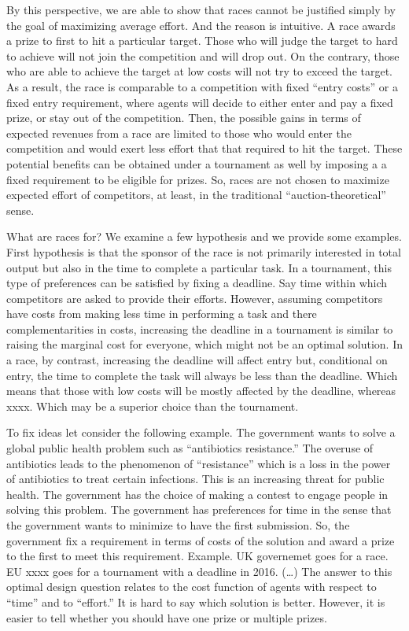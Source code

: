 \documentclass[12pt,]{article}
\begin{document}
By this perspective, we are able to show that races cannot be justified
simply by the goal of maximizing average effort. And the reason is
intuitive. A race awards a prize to first to hit a particular target.
Those who will judge the target to hard to achieve will not join the
competition and will drop out. On the contrary, those who are able to
achieve the target at low costs will not try to exceed the target. As a
result, the race is comparable to a competition with fixed ``entry
costs'' or a fixed entry requirement, where agents will decide to either
enter and pay a fixed prize, or stay out of the competition. Then, the
possible gains in terms of expected revenues from a race are limited to
those who would enter the competition and would exert less effort that
that required to hit the target. These potential benefits can be
obtained under a tournament as well by imposing a a fixed requirement to
be eligible for prizes. So, races are not chosen to maximize expected
effort of competitors, at least, in the traditional
``auction-theoretical'' sense.

What are races for? We examine a few hypothesis and we provide some
examples. First hypothesis is that the sponsor of the race is not
primarily interested in total output but also in the time to complete a
particular task. In a tournament, this type of preferences can be
satisfied by fixing a deadline. Say time within which competitors are
asked to provide their efforts. However, assuming competitors have costs
from making less time in performing a task and there complementarities
in costs, increasing the deadline in a tournament is similar to raising
the marginal cost for everyone, which might not be an optimal solution.
In a race, by contrast, increasing the deadline will affect entry but,
conditional on entry, the time to complete the task will always be less
than the deadline. Which means that those with low costs will be mostly
affected by the deadline, whereas xxxx. Which may be a superior choice
than the tournament.

To fix ideas let consider the following example. The government wants to
solve a global public health problem such as ``antibiotics resistance.''
The overuse of antibiotics leads to the phenomenon of ``resistance''
which is a loss in the power of antibiotics to treat certain infections.
This is an increasing threat for public health. The government has the
choice of making a contest to engage people in solving this problem. The
government has preferences for time in the sense that the government
wants to minimize to have the first submission. So, the government fix a
requirement in terms of costs of the solution and award a prize to the
first to meet this requirement. Example. UK governemet goes for a race.
EU xxxx goes for a tournament with a deadline in 2016. (\ldots{}) The
answer to this optimal design question relates to the cost function of
agents with respect to ``time'' and to ``effort.'' It is hard to say
which solution is better. However, it is easier to tell whether you
should have one prize or multiple prizes.
\end{document}
